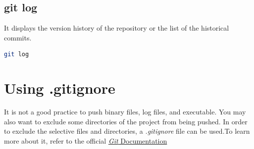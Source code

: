 \documentclass[letterpaper]{article}
\begin{document}
\subsection{git log}
It displays the version history of the repository or the list of the historical commits. 
\begin{lstlisting}[language=Bash]
git log
\end{lstlisting}

\section{Using .gitignore}
It is not a good practice to push binary files, log files, and executable. You may also want to exclude some directories of the project from being pushed. In order to exclude the selective files and directories, a \textit{.gitignore} file can be used.To learn more about it,  refer to the official \href{https://git-scm.com/docs/gitignore}{\textit{Git} Documentation}
\end{document}
